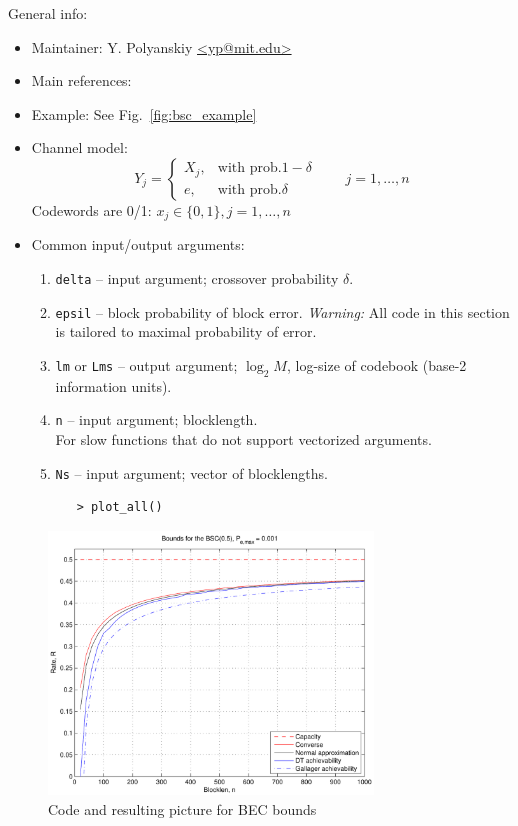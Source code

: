 \documentclass[a4paper,11p]{memoir}
\begin{document}
General info:
\begin{itemize}
\item Maintainer: Y. Polyanskiy \url{<yp@mit.edu>}

\item Main references: \cite{PPV08}

\item Example: See Fig.~\ref{fig:bsc_example} 

\item Channel model:
	$$ Y_j = \begin{cases} X_j, & \mbox{with prob.} 1-\delta\\
				e, & \mbox{with prob.} \delta
		\end{cases} \qquad j=1,\ldots,n $$
	Codewords are 0/1: $x_j \in \{0,1\}, j=1,\ldots,n$

\item Common input/output arguments:
\begin{enumerate}
\item \verb|delta| -- input argument; crossover probability $\delta$.
\item \verb|epsil| -- block probability of block error. \textit{Warning:} All code in this section is tailored to
maximal probability of error.
\item \verb|lm| or \verb|Lms| -- output argument; $\log_2 M$, log-size of codebook (base-2 information units). 
\item \verb|n| -- input argument; blocklength.\\
		For slow functions that do not support vectorized arguments.
\item \verb|Ns| -- input argument; vector of blocklengths.
\end{enumerate}
\end{itemize}

\begin{figure}
\centering
\begin{verbatim}
	> plot_all()
\end{verbatim}
\includegraphics[height=7cm]{plots/bec_example}
\caption{Code and resulting picture for BEC bounds}\label{fig:bec_example}
\end{figure}
\end{document}

